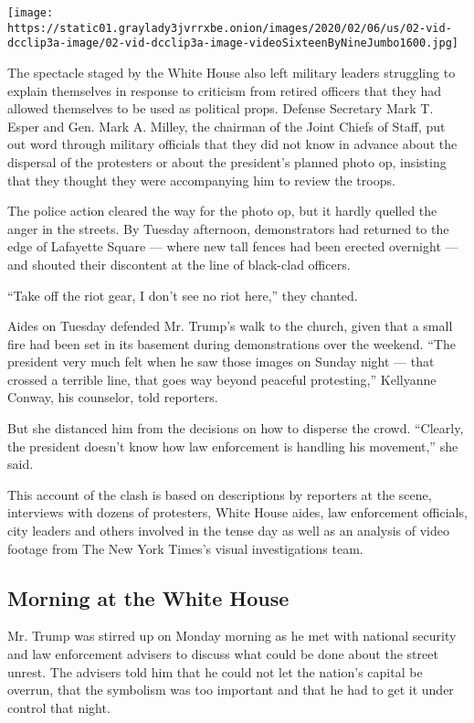 \texttt{[image: https://static01.graylady3jvrrxbe.onion/images/2020/02/06/us/02-vid-dcclip3a-image/02-vid-dcclip3a-image-videoSixteenByNineJumbo1600.jpg]}

The spectacle staged by the White House also left military leaders
struggling to explain themselves in response to criticism from retired
officers that they had allowed themselves to be used as political props.
Defense Secretary Mark T. Esper and Gen. Mark A. Milley, the chairman of
the Joint Chiefs of Staff, put out word through military officials that
they did not know in advance about the dispersal of the protesters or
about the president's planned photo op, insisting that they thought they
were accompanying him to review the troops.

The police action cleared the way for the photo op, but it hardly
quelled the anger in the streets. By Tuesday afternoon, demonstrators
had returned to the edge of Lafayette Square --- where new tall fences
had been erected overnight --- and shouted their discontent at the line
of black-clad officers.

``Take off the riot gear, I don't see no riot here,'' they chanted.

Aides on Tuesday defended Mr. Trump's walk to the church, given that a
small fire had been set in its basement during demonstrations over the
weekend. ``The president very much felt when he saw those images on
Sunday night --- that crossed a terrible line, that goes way beyond
peaceful protesting,'' Kellyanne Conway, his counselor, told reporters.

But she distanced him from the decisions on how to disperse the crowd.
``Clearly, the president doesn't know how law enforcement is handling
his movement,'' she said.

This account of the clash is based on descriptions by reporters at the
scene, interviews with dozens of protesters, White House aides, law
enforcement officials, city leaders and others involved in the tense day
as well as an analysis of video footage from The New York Times's visual
investigations team.

\hypertarget{morning-at-the-white-house}{%
\subsection{Morning at the White
House}\label{morning-at-the-white-house}}

Mr. Trump was stirred up on Monday morning as he met with national
security and law enforcement advisers to discuss what could be done
about the street unrest. The advisers told him that he could not let the
nation's capital be overrun, that the symbolism was too important and
that he had to get it under control that night.

